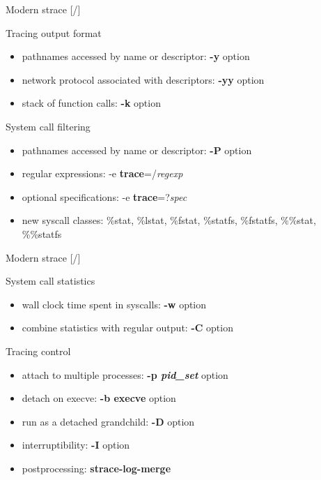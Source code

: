 \documentclass[unicode,aspectratio=169,xcolor={table,dvipsnames,usernames}]{beamer}
\begin{document}
\begin{frame}{Modern strace \hfill [\insertframenumber/\inserttotalframenumber]}
\Large
\begin{block}{Tracing output format}
\begin{itemize}
\item pathnames accessed by name or descriptor: \textbf{-y} option
\item network protocol associated with descriptors: \textbf{-yy} option
\item stack of function calls: \textbf{-k} option
\end{itemize}
\end{block}

\begin{block}{System call filtering}
\begin{itemize}
\item pathnames accessed by name or descriptor: \textbf{-P} option
\item regular expressions: -e \textbf{trace}=/\textit{regexp}
\item optional specifications: -e \textbf{trace}=?\textit{spec}
\item new syscall classes: \%stat, \%lstat, \%fstat, \%statfs, \%fstatfs, \%\%stat, \%\%statfs
\end{itemize}
\end{block}
\end{frame}

\begin{frame}{Modern strace \hfill [\insertframenumber/\inserttotalframenumber]}
\Large
\begin{block}{System call statistics}
\begin{itemize}
\item wall clock time spent in syscalls: \textbf{-w} option
\item combine statistics with regular output: \textbf{-C} option
\end{itemize}
\end{block}

\begin{block}{Tracing control}
\begin{itemize}
\item attach to multiple processes: \textbf{-p \textit{pid\_set}} option
\item detach on execve: \textbf{-b execve} option
\item run as a detached grandchild: \textbf{-D} option
\item interruptibility: \textbf{-I} option
\item postprocessing: \textbf{strace-log-merge}
\end{itemize}
\end{block}
\end{frame}
\end{document}
